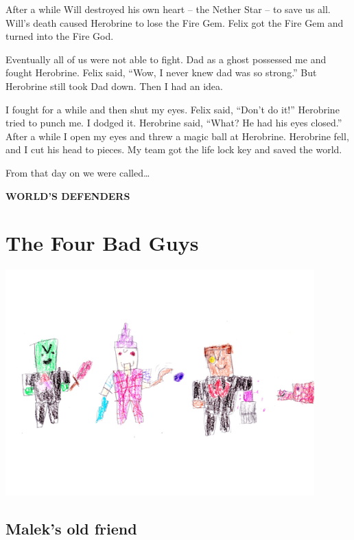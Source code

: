 \documentclass[letterpaper, oneside, 12pt]{krantz}
\begin{document}
After a while Will destroyed his own heart -- the Nether Star -- to save
us all. Will's death caused Herobrine to lose the Fire Gem. Felix got
the Fire Gem and turned into the Fire God.

Eventually all of us were not able to fight. Dad as a ghost possessed me
and fought Herobrine. Felix said, ``Wow, I never knew dad was so
strong.'' But Herobrine still took Dad down. Then I had an idea.

I fought for a while and then shut my eyes. Felix said, ``Don't do it!''
Herobrine tried to punch me. I dodged it. Herobrine said, ``What? He had
his eyes closed.'' After a while I open my eyes and threw a magic ball
at Herobrine. Herobrine fell, and I cut his head to pieces. My team got
the life lock key and saved the world.

From that day on we were called\ldots{}

\textbf{WORLD'S DEFENDERS}

\hypertarget{the-four-bad-guys}{%
\chapter{The Four Bad Guys}\label{the-four-bad-guys}}

\includegraphics[width=4.6875in,height=\textheight]{img/four-bad-guys/05-four-bad-guys.jpg}

\clearpage

\hypertarget{maleks-old-friend}{%
\section{Malek's old friend}\label{maleks-old-friend}}
\end{document}
